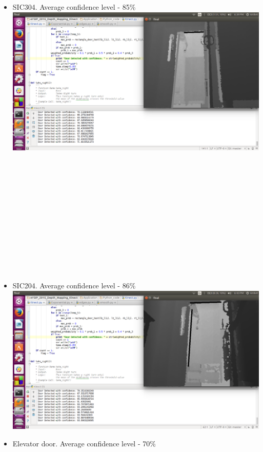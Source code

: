 \documentclass{report}
\begin{document}
\begin{itemize}
 \item SIC304. Average confidence level - 85\% \\
 \includegraphics[width = 15cm]{confidence_304.png} \\ \\ \\ \\ \\ \\ \\ \\ \\ \\ \\ \\ \\
 \item SIC204. Average confidence level - 86\% \\ 
 \includegraphics[width = 15cm]{confidence_204.png} \\
 \item Elevator door. Average confidence level - 70\% \\

\end{itemize}
\end{document}
